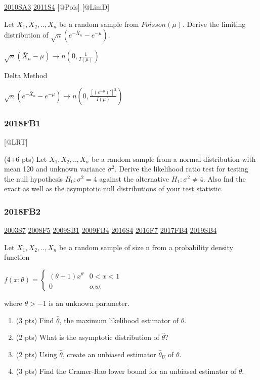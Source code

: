 \documentclass[6pt,Portrait]{article}
\begin{document}
\protect\hyperlink{sa3-1}{2010SA3} \protect\hyperlink{s4-2}{2011S4}
{[}@Pois{]} {[}@LimD{]}

Let \(X_1,X_2,..,X_n\) be a random sample from \(Poisson(\mu)\). Derive
the limiting distribution of \(\sqrt{n}(e^{-\bar X_n}-e^{-\mu})\).

\(\sqrt{n}(\bar X_n-\mu)\to n(0,\frac1{I(\mu)})\)

Delta Method

\(\sqrt{n}(e^{-\bar X_n}-e^{-\mu})\to n(0,\frac{[(e^{-\mu})']^2}{I(\mu)})\)

\hypertarget{fb1-4}{%
\subsubsection{2018FB1}\label{fb1-4}}

{[}@LRT{]}

(4+6 pts) Let \(X_1,X_2,..,X_n\) be a random sample from a normal
distribution with mean 120 and unknown variance \(\sigma^2\). Derive the
likelihood ratio test for testing the null hypothesis \(H_0:\sigma^2=4\)
against the alternative \(H_1:\sigma^2\neq4\). Also fnd the exact as
well as the asymptotic null distributions of your test statistic.

\hypertarget{fb2-4}{%
\subsubsection{2018FB2}\label{fb2-4}}

\protect\hyperlink{s7}{2003S7} \protect\hyperlink{f5-3}{2008F5}
\protect\hyperlink{sb1}{2009SB1} \protect\hyperlink{fb4}{2009FB4}
\protect\hyperlink{s4-4}{2016S4} \protect\hyperlink{f7-5}{2016F7}
\protect\hyperlink{fb4-3}{2017FB4} \protect\hyperlink{sb4-2}{2019SB4}

Let \(X_1,X_2,..,X_n\) be a random sample of size n from a probability
density function

\(f(x;\theta)=\begin{cases}(\theta+1)x^\theta& 0<x<1\\0& o.w.\end{cases}\)

where \(\theta>-1\) is an unknown parameter.

\begin{enumerate}
\def\labelenumi{(\alph{enumi})}
\item
  (3 pts) Find \(\hat\theta\), the maximum likelihood estimator of
  \(\theta\).
\item
  (2 pts) What is the asymptotic distribution of \(\hat\theta\)?
\item
  (2 pts) Using \(\hat\theta\), create an unbiased estimator
  \(\hat\theta_U\) of \(\theta\).
\item
  (3 pts) Find the Cramer-Rao lower bound for an unbiased estimator of
  \(\theta\).
\end{enumerate}
\end{document}
